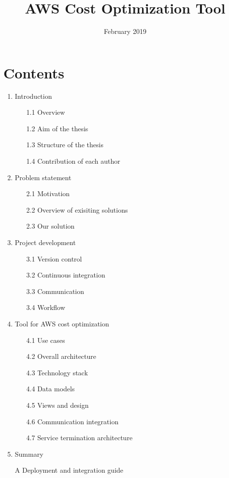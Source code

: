 \documentclass[licencjacka,en]{thesisclass}
\title{AWS Cost Optimization Tool}
\date{February 2019}
\begin{document}
    \maketitle

    \begin{abstract}
        
    \end{abstract}

    \chapter*{Contents}

    \begin{enumerate}
        \item Introduction
        \begin{enumerate}
            \item [1.1] Overview
            \item [1.2] Aim of the thesis
            \item [1.3] Structure of the thesis
            \item [1.4] Contribution of each author
        \end{enumerate}
        \item Problem statement
        \begin{enumerate}
            \item [2.1] Motivation
            \item [2.2] Overview of exisiting solutions
            \item [2.3] Our solution
        \end{enumerate}
        \item Project development
        \begin{enumerate}
            \item [3.1] Version control
            \item [3.2] Continuous integration
            \item [3.3] Communication
            \item [3.4] Workflow
        \end{enumerate}
        \item Tool for AWS cost optimization
        \begin{enumerate}
            \item [4.1] Use cases
            \item [4.2] Overall architecture
            \item [4.3] Technology stack
            \item [4.4] Data models
            \item [4.5] Views and design
            \item [4.6] Communication integration
            \item [4.7] Service termination architecture
        \end{enumerate}
        \item Summary
        \item [A] Deployment and integration guide
    \end{enumerate}
\end{document}
